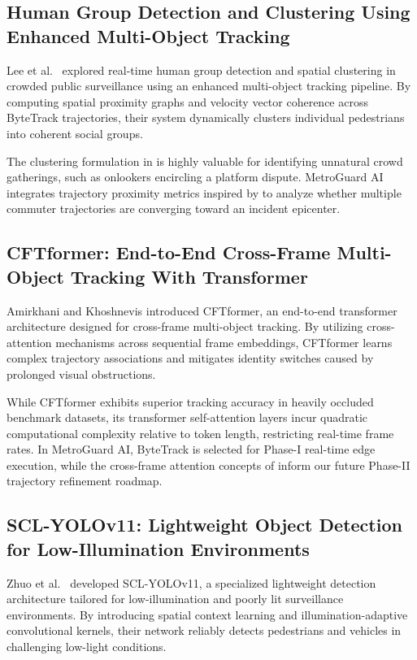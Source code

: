 \documentclass[12pt,a4paper]{report}
\begin{document}
\subsection{Human Group Detection and Clustering Using Enhanced Multi-Object Tracking}
Lee et al.\ \cite{p16} explored real-time human group detection and spatial clustering in crowded public surveillance using an enhanced multi-object tracking pipeline. By computing spatial proximity graphs and velocity vector coherence across ByteTrack trajectories, their system dynamically clusters individual pedestrians into coherent social groups.

The clustering formulation in \cite{p16} is highly valuable for identifying unnatural crowd gatherings, such as onlookers encircling a platform dispute. MetroGuard AI integrates trajectory proximity metrics inspired by \cite{p16} to analyze whether multiple commuter trajectories are converging toward an incident epicenter.

\subsection{CFTformer: End-to-End Cross-Frame Multi-Object Tracking With Transformer}
Amirkhani and Khoshnevis \cite{p18} introduced CFTformer, an end-to-end transformer architecture designed for cross-frame multi-object tracking. By utilizing cross-attention mechanisms across sequential frame embeddings, CFTformer learns complex trajectory associations and mitigates identity switches caused by prolonged visual obstructions.

While CFTformer exhibits superior tracking accuracy in heavily occluded benchmark datasets, its transformer self-attention layers incur quadratic computational complexity relative to token length, restricting real-time frame rates. In MetroGuard AI, ByteTrack is selected for Phase-I real-time edge execution, while the cross-frame attention concepts of \cite{p18} inform our future Phase-II trajectory refinement roadmap.

\subsection{SCL-YOLOv11: Lightweight Object Detection for Low-Illumination Environments}
Zhuo et al.\ \cite{p19} developed SCL-YOLOv11, a specialized lightweight detection architecture tailored for low-illumination and poorly lit surveillance environments. By introducing spatial context learning and illumination-adaptive convolutional kernels, their network reliably detects pedestrians and vehicles in challenging low-light conditions.
\end{document}
